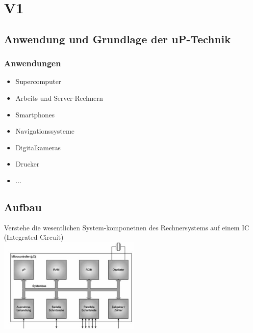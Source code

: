 \section{V1}
\subsection{Anwendung und Grundlage der uP-Technik}
\begin{multicols}{2}
\subsubsection{Anwendungen}
\begin{minipage}{5cm}
\begin{itemize}
    \item Supercomputer
    \item Arbeits und Server-Rechnern
    \item Smartphones
    \item Navigationssysteme
    \item Digitalkameras
    \item Drucker
    \item ...
\end{itemize}
\end{minipage}

\subsection{Aufbau}

Verstehe die wesentlichen System-komponetnen des Rechnersystems auf einem IC (Integrated Circuit)\\	
\includegraphics[width=7cm]{images/aufbauuC}

\end{multicols}
